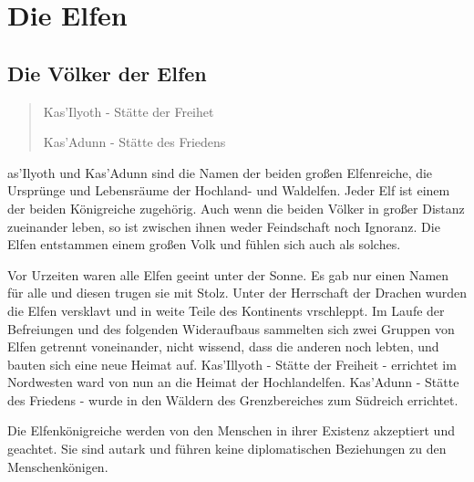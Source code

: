 \section{Die Elfen}
\label{dieelfen}

\subsection{Die Völker der Elfen}
\begin{quotation}
\par Kas'Ilyoth - Stätte der Freihet
\par Kas'Adunn - Stätte des Friedens
\end{quotation}

as'Ilyoth
und Kas'Adunn sind die Namen der beiden großen Elfenreiche, die
Ursprünge und Lebensräume der Hochland- und Waldelfen. Jeder Elf ist
einem der beiden Königreiche zugehörig. Auch wenn die beiden Völker
in großer Distanz zueinander leben, so ist zwischen ihnen weder
Feindschaft noch Ignoranz. Die Elfen entstammen einem großen Volk
und fühlen sich auch als solches.

\par Vor Urzeiten waren alle Elfen geeint unter der Sonne. Es gab
nur einen Namen für alle und diesen trugen sie mit Stolz. Unter der
Herrschaft der Drachen wurden die Elfen versklavt und in weite Teile
des Kontinents vrschleppt. Im Laufe der Befreiungen und des
folgenden Wideraufbaus sammelten sich zwei Gruppen von Elfen
getrennt voneinander, nicht wissend, dass die anderen noch lebten,
und bauten sich eine neue Heimat auf. Kas'Illyoth - Stätte der
Freiheit - errichtet im Nordwesten ward von nun an die Heimat der
Hochlandelfen. Kas'Adunn - Stätte des Friedens - wurde in den
Wäldern des Grenzbereiches zum Südreich errichtet.

\par Die Elfenkönigreiche werden von den Menschen in ihrer Existenz
akzeptiert und geachtet. Sie sind autark und führen keine
diplomatischen Beziehungen zu den Menschenkönigen.

